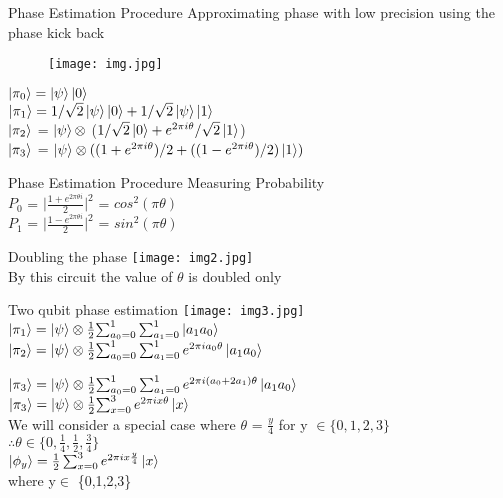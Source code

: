 \documentclass[12pt]{beamer}
\begin{document}
\begin{frame}{Phase Estimation Procedure}
Approximating phase with low precision using the phase kick back 
\begin{figure}
\texttt{[image: img.jpg]}
\end{figure}
$\ket{\pi_0} = \ket{\psi}\ket{0}$\\
$\ket{\pi_1} = {1/\sqrt{2}}\ket{\psi}\ket{0} + {1/\sqrt{2}\ket{\psi}\ket{1}}$\\
$\ket{\pi_2}$ = $\ket{\psi}\otimes$ (${1/\sqrt{2}}\ket{0} + {{e^{2\pi i \theta}}/\sqrt{2}}\ket{1}$)\\
$\ket{\pi_3}$ = $\ket{\psi}\otimes ((1+{e^{2\pi i \theta}})/2 + ((1-{e^{2\pi i \theta}})/2)\ket{1}) $
\end{frame}
\begin{frame}{Phase Estimation Procedure}
Measuring Probability \\
\vspace{1cm}
$P_0$ = $\big | \frac{1+e^{2\pi\theta i}}{2} \big |^2$ = $cos^2(\pi\theta)$ \\
\vspace{1cm}
$P_1$ = $\big | \frac{1-e^{2\pi\theta i}}{2} \big |^2$ = $sin^2(\pi\theta)$\\
\end{frame}
\begin{frame}{Doubling the phase}
\texttt{[image: img2.jpg]} \\
\vspace{1cm}
By this circuit the value of $\theta$ is doubled only\\
\end{frame}
\begin{frame}{Two qubit phase estimation}
\texttt{[image: img3.jpg]} \\
$\ket{\pi_1} = \ket{\psi}\otimes \frac{1}{2}{\sum_{a_0=0}^{1}\sum_{a_1=0}^{1}\ket{a_1 a_0}}$\\
$\ket{\pi_2} = \ket{\psi}\otimes \frac{1}{2}{\sum_{a_0=0}^{1}\sum_{a_1=0}^{1}e^{2\pi i a_0 \theta}\ket{a_1 a_0}}$
\end{frame}
\begin{frame}
$\ket{\pi_3} = \ket{\psi}\otimes \frac{1}{2}{\sum_{a_0=0}^{1}\sum_{a_1=0}^{1}e^{2\pi i (a_0+2a_1) \theta}\ket{a_1 a_0}}$\\
\vspace{0.5cm}
$\ket{\pi_3} = \ket{\psi}\otimes \frac{1}{2}{\sum_{x=0}^{3}e^{2\pi i x \theta}\ket{x}}$\\
\vspace{0.5cm}
We will consider a special case where $\theta$ = $\frac{y}{4}$ for y $\in \{0,1,2,3\}$\\
$\therefore \theta \in \{0,\frac{1}{4},\frac{1}{2},\frac{3}{4}\}$\\
\vspace{0.5cm}
$\ket{\phi_y} = \frac{1}{2} \sum_{x=0}^{3}e^{2\pi i x \frac{y}{4}}\ket{x}$\\
\vspace{0.5cm}
\hspace{2cm} where y$\in$ \{0,1,2,3\}
\end{frame}
\end{document}
